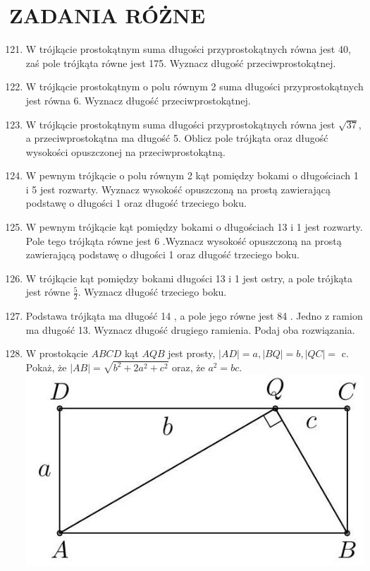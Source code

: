 \documentclass[10pt]{article}
\begin{document}
\section*{ZADANIA RÓŻNE}
\begin{enumerate}
  \setcounter{enumi}{120}
  \item W trójkącie prostokątnym suma długości przyprostokątnych równa jest 40, zaś pole trójkąta równe jest 175. Wyznacz długość przeciwprostokątnej.
  \item W trójkącie prostokątnym o polu równym 2 suma długości przyprostokątnych jest równa 6. Wyznacz długość przeciwprostokątnej.
  \item W trójkącie prostokątnym suma długości przyprostokątnych równa jest \(\sqrt{37}\), a przeciwprostokątna ma długość 5. Oblicz pole trójkąta oraz długość wysokości opuszczonej na przeciwprostokątną.
  \item W pewnym trójkącie o polu równym 2 kąt pomiędzy bokami o długościach 1 i 5 jest rozwarty. Wyznacz wysokość opuszczoną na prostą zawierającą podstawę o długości 1 oraz długość trzeciego boku.
  \item W pewnym trójkącie kąt pomiędzy bokami o długościach 13 i 1 jest rozwarty. Pole tego trójkąta równe jest 6 .Wyznacz wysokość opuszczoną na prostą zawierającą podstawę o długości 1 oraz długość trzeciego boku.
  \item W trójkącie kąt pomiędzy bokami długości 13 i 1 jest ostry, a pole trójkąta jest równe \(\frac{5}{2}\). Wyznacz długość trzeciego boku.
  \item Podstawa trójkąta ma długość 14 , a pole jego równe jest 84 . Jedno z ramion ma długość 13. Wyznacz długość drugiego ramienia. Podaj oba rozwiązania.
  \item W prostokącie \(A B C D\) kąt \(A Q B\) jest prosty, \(|A D|=a,|B Q|=b,|Q C|=\) c. Pokaż, że \(|A B|=\sqrt{b^{2}+2 a^{2}+c^{2}}\) oraz, że \(a^{2}=b c\).\\
\includegraphics[max width=\textwidth, center]{2024_11_21_71f62bd117d375398909g-144}\\

\end{enumerate}
\end{document}
